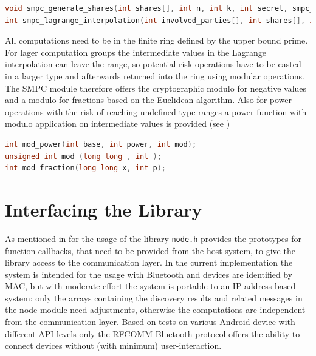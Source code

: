 \begin{lstlisting}[language=C, caption={Public function prototypes in smpc.h}, label={Public function prototypes in smpc.h}, float, floatplacement=H]
void smpc_generate_shares(int shares[], int n, int k, int secret, smpc_share_type type);
int smpc_lagrange_interpolation(int involved_parties[], int shares[], int k);
\end{lstlisting}

All computations need to be in the finite ring defined by the upper bound prime. For lager computation groups the intermediate values in the Lagrange interpolation can leave the range, so potential risk operations have to be casted in a larger type and afterwards returned into the ring using modular operations. The \gls{SMPC} module therefore offers the cryptographic modulo for negative values and a modulo for fractions based on the Euclidean algorithm. Also for power operations with the risk of reaching undefined type ranges a power function with modulo application on intermediate values is provided (see )

\begin{lstlisting}[language=C, caption={Modular operations in smpc.c}, label={Modular operations in smpc.c}, float, floatplacement=H]
int mod_power(int base, int power, int mod);
unsigned int mod (long long , int );
int mod_fraction(long long x, int p);
\end{lstlisting}

\section{Interfacing the Library} \label{Interfacing the Library}

As mentioned in  for the usage of the library \lstinline|node.h| provides the prototypes for function callbacks, that need to be provided from the host system, to give the library access to the communication layer. In the current implementation the system is intended for the usage with Bluetooth and devices are identified by \gls{MAC}, but with moderate effort the system is portable to an IP address based system: only the arrays containing the discovery results and related messages in the node module need adjustments, otherwise the computations are independent from the communication layer.
Based on tests on various Android device with different \gls{API} levels only the \gls{RFCOMM} Bluetooth protocol offers the ability to connect devices without (with minimum) user-interaction.

